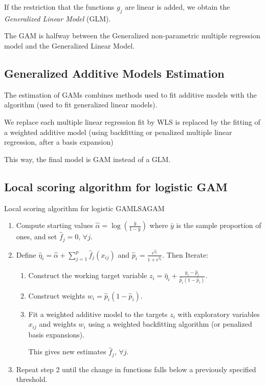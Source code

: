 If the restriction that the functions $g_j$ are linear is added,
we obtain the \emph{Generalized Linear Model} (GLM).

\begin{note}
The GAM is halfway between the Generalized non-parametric multiple regression model
and the Generalized Linear Model.
\end{note}

\subsection{Generalized Additive Models Estimation}

The estimation of GAMs combines methods used to fit additive models with the
 algorithm (used to fit generalized linear models).

We replace each multiple linear regression fit by WLS is replaced
by the fitting of a weighted additive model (using backfitting
or penalized multiple linear regression, after a basis expansion)

This way, the final model is GAM instead of a GLM.

\subsection{Local scoring algorithm for logistic GAM}

\begin{algorithm}{Local scoring algorithm for logistic GAM}{LSAGAM}
\begin{enumerate}
    \item Compute starting values $\hat \alpha = \log \left( \frac{\bar y}{1-\bar y} \right)$
        where $\bar y$ is the sample proportion of ones, and set $\hat f_j = 0,\,\forall j$.
    \item Define $\hat \eta_i = \hat \alpha + \sum_{j=1}^p \hat f_j(x_{ij})$ and
        $\hat p_i = \frac{e^{\hat \eta_i}}{1+e^{\hat \eta_i}}$.
    Then Iterate:
        \begin{enumerate}
            \item Construct the working target variable $z_i = \hat \eta_i + \frac{y_i - \hat p_i}{\hat p_i(1-\hat p_i)}$.
            \item Construct weights $w_i = \hat p_i(1-\hat p_i)$.
            \item Fit a weighted additive model to the targets $z_i$ with
                exploratory variables $x_{ij}$ and weights $w_i$ using
                a weighted backfitting algorithm (or penalized basis expansions).

                This gives new estimates $\hat f_j,\,\forall j$.
        \end{enumerate}
        \item Repeat step 2 until the change in functions falls below a previously
            specified threshold.
\end{enumerate}
\end{algorithm}

